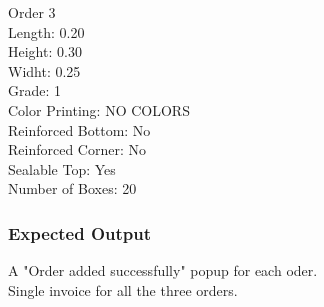 \documentclass[12pt]{article}
\begin{document}
Order 3\\
Length: 0.20\\
Height: 0.30\\
Widht: 0.25\\
Grade: 1\\
Color Printing: NO COLORS\\
Reinforced Bottom: No\\
Reinforced Corner: No\\
Sealable Top: Yes\\
Number of Boxes: 20\\
\subsubsection{Expected Output}
A "Order added successfully" popup for each oder.\\
Single invoice for all the three orders.
\end{document}
